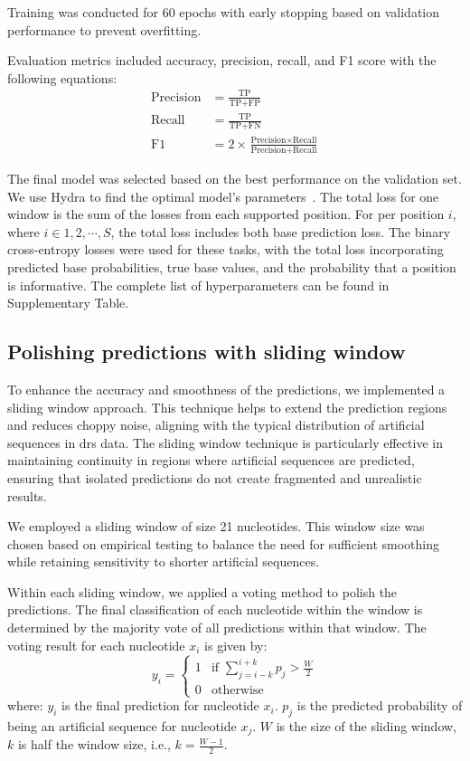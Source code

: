 \documentclass[pdflatex, sn-mathphys-num, lineno]{sn-jnl}%
\theoremstyle{thmstyleone}%
\theoremstyle{thmstyletwo}%
\theoremstyle{thmstylethree}%
\begin{document}
Training was conducted for \num{60} epochs with early stopping based on validation performance to prevent overfitting.

Evaluation metrics included accuracy, precision, recall, and F1 score with the following equations:
\begin{align*}
	\textrm{Precision} & = \frac{\textrm{TP}}{\textrm{TP}+\textrm{FP}}                                                     \\
	\textrm{Recall}    & = \frac{\textrm{TP}}{\textrm{TP}+\textrm{FN}}                                                     \\
	\textrm{F1}        & = 2 \times \frac{\textrm{Precision} \times \textrm{Recall}}{\textrm{Precision} + \textrm{Recall}}
\end{align*}

The final model was selected based on the best performance on the validation set.
We use Hydra to find the optimal model's parameters~\cite{Yadan2019Hydra}.
The total loss for one window is the sum of the losses from each supported position.
For per position  \( i \), where \( i  \in {1,2, \cdots, S} \),  the total loss includes both base prediction loss.
The binary cross-entropy losses were used for these tasks, with the total loss incorporating predicted base probabilities, true base values, and the probability that a position is informative.
The complete list of hyperparameters can be found in Supplementary Table.

\subsection{Polishing predictions with sliding window}

To enhance the accuracy and smoothness of the predictions, we implemented a sliding window approach.
This technique helps to extend the prediction regions and reduces choppy noise, aligning with the typical distribution of artificial sequences in \gls{drs} data.
The sliding window technique is particularly effective in maintaining continuity in regions where artificial sequences are predicted, ensuring that isolated predictions do not create fragmented and unrealistic results.

We employed a sliding window of size 21 nucleotides.
This window size was chosen based on empirical testing to balance the need for sufficient smoothing while retaining sensitivity to shorter artificial sequences.

Within each sliding window, we applied a voting method to polish the predictions.
The final classification of each nucleotide within the window is determined by the majority vote of all predictions within that window.
The voting result for each nucleotide \( x_i \) is given by:
\[
y_i = \begin{cases}
    1 & \text{if } \sum_{j=i-k}^{i+k} p_j > \frac{W}{2} \\
    0 & \text{otherwise}
\end{cases}
\]
where: \( y_i \) is the final prediction for nucleotide \( x_i \). \( p_j \) is the predicted probability of being an artificial sequence for nucleotide \( x_j \). \( W \) is the size of the sliding window, \( k \) is half the window size, i.e., \( k = \frac{W-1}{2} \).
\end{document}
